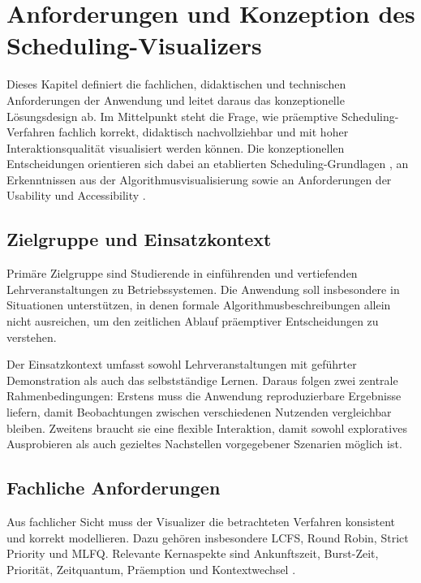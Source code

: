\chapter{Anforderungen und Konzeption des Scheduling-Visualizers}

Dieses Kapitel definiert die fachlichen, didaktischen und technischen Anforderungen der Anwendung und leitet daraus das konzeptionelle Lösungsdesign ab. Im Mittelpunkt steht die Frage, wie präemptive Scheduling-Verfahren fachlich korrekt, didaktisch nachvollziehbar und mit hoher Interaktionsqualität visualisiert werden können. Die konzeptionellen Entscheidungen orientieren sich dabei an etablierten Scheduling-Grundlagen \cite{silberschatz2018operating,tanenbaum2014modern,pinedo2016scheduling}, an Erkenntnissen aus der Algorithmusvisualisierung \cite{hundhausen2002meta,naps2002engagement} sowie an Anforderungen der Usability und Accessibility \cite{brooke1996sus,wcag2018}.

\section{Zielgruppe und Einsatzkontext}

Primäre Zielgruppe sind Studierende in einführenden und vertiefenden Lehrveranstaltungen zu Betriebssystemen. Die Anwendung soll insbesondere in Situationen unterstützen, in denen formale Algorithmusbeschreibungen allein nicht ausreichen, um den zeitlichen Ablauf präemptiver Entscheidungen zu verstehen.

Der Einsatzkontext umfasst sowohl Lehrveranstaltungen mit geführter Demonstration als auch das selbstständige Lernen. Daraus folgen zwei zentrale Rahmenbedingungen: Erstens muss die Anwendung reproduzierbare Ergebnisse liefern, damit Beobachtungen zwischen verschiedenen Nutzenden vergleichbar bleiben. Zweitens braucht sie eine flexible Interaktion, damit sowohl exploratives Ausprobieren als auch gezieltes Nachstellen vorgegebener Szenarien möglich ist.

\section{Fachliche Anforderungen}

Aus fachlicher Sicht muss der Visualizer die betrachteten Verfahren konsistent und korrekt modellieren. Dazu gehören insbesondere LCFS, Round Robin, Strict Priority und MLFQ. Relevante Kernaspekte sind Ankunftszeit, Burst-Zeit, Priorität, Zeitquantum, Präemption und Kontextwechsel \cite{silberschatz2018operating,tanenbaum2014modern}.

